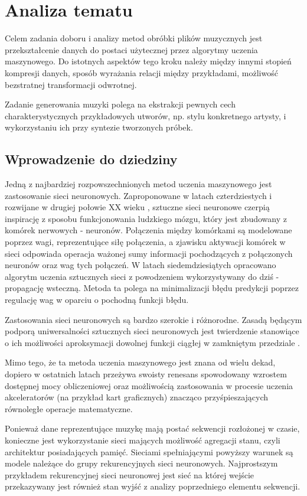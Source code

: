 \chapter{Analiza tematu}
{
  Celem zadania doboru i analizy metod obróbki plików muzycznych jest 
  przekształcenie danych do postaci użytecznej przez algorytmy uczenia maszynowego.
  Do istotnych aspektów tego kroku należy między innymi stopień kompresji danych,
  sposób wyrażania relacji między przykładami, możliwość bezstratnej transformacji odwrotnej. 

  Zadanie generowania muzyki polega na ekstrakcji pewnych cech charakterystycznych
  przykładowych utworów, np. stylu konkretnego artysty, 
  i wykorzystaniu ich przy syntezie tworzonych próbek. 

  \section{Wprowadzenie do dziedziny}
  {
    Jedną z najbardziej rozpowszechnionych metod uczenia maszynowego jest zastosowanie sieci neuronowych.
    Zaproponowane w latach czterdziestych i rozwijane w drugiej połowie XX wieku \cite{McCulloch1943}, sztuczne sieci neuronowe
    czerpią inspirację z sposobu funkcjonowania ludzkiego mózgu, który jest zbudowany z komórek nerwowych - neuronów.
    Połączenia między komórkami są modelowane poprzez wagi, reprezentujące siłę połączenia, a zjawisku aktywacji
    komórek w sieci odpowiada operacja ważonej sumy informacji pochodzących z połączonych neuronów oraz wag tych połączeń.
    W latach siedemdziesiątych opracowano algorytm uczenia sztucznych sieci z powodzeniem wykorzystywany
    do dziś - propagację wsteczną. Metoda ta polega na minimalizacji błędu predykcji poprzez regulację
    wag w oparciu o pochodną funkcji błędu.

    Zastosowania sieci neuronowych są bardzo szerokie i różnorodne. Zasadą będącym podporą uniwersalności 
    sztucznych sieci neuronowych jest twierdzenie stanowiące o ich możliwości aproksymacji dowolnej 
    funkcji ciągłej w zamkniętym przedziale \cite{Csji2001ApproximationWA}.

    Mimo tego, że ta metoda uczenia maszynowego jest znana od wielu dekad, dopiero w ostatnich latach
    przeżywa swoisty renesans spowodowany wzrostem dostępnej mocy obliczeniowej oraz 
    możliwością zastosowania w procesie uczenia akceleratorów (na przykład kart graficznych) znacząco 
    przyśpieszających równoległe operacje matematyczne.


    Ponieważ dane reprezentujące muzykę mają postać sekwencji rozłożonej w czasie, 
    konieczne jest wykorzystanie sieci mających możliwość agregacji stanu, czyli architektur posiadających pamięć.
    Sieciami spełniającymi powyższy warunek są modele należące do grupy rekurencyjnych sieci neuronowych.
    Najprostszym przykładem rekurencyjnej sieci neuronowej jest sieć na której wejście 
    przekazywany jest również stan wyjść z analizy poprzedniego elementu sekwencji.
    
}}
